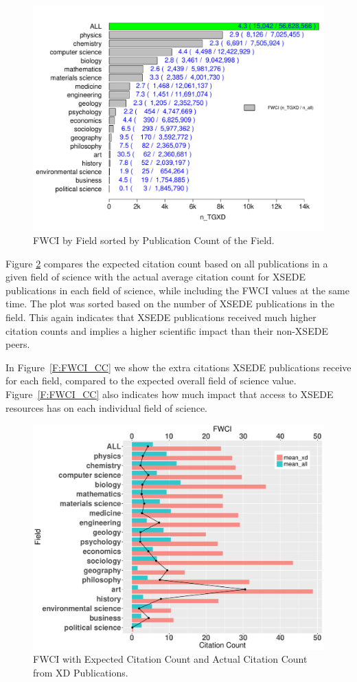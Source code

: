 \documentclass{sig-alternate}
\begin{document}
\begin{figure}[htb!]
    \includegraphics[width=0.95\columnwidth]{images/fwci_nxd.pdf}
    \caption{FWCI by Field sorted by Publication Count of the Field.}
    \label{F:fwci_nxd}
\end{figure}

Figure \ref{F:FWCIwCC} compares the expected citation count based on
all publications in a given field of science with the actual average
citation count for XSEDE publications in each field of science, while
including the FWCI values at the same time. The plot was sorted based
on the number of XSEDE publications in the field. This
again indicates that XSEDE publications received much higher citation
counts and implies a higher scientific impact than their non-XSEDE
peers.

In Figure~\ref{F:FWCI_CC} we show the extra citations XSEDE
publications receive for each field, compared to the expected overall
field of science value. Figure~\ref{F:FWCI_CC} also indicates how much
impact that access to XSEDE resources has on each individual field of
science.

\begin{figure}[htb!]
    \includegraphics[width=0.95\columnwidth]{images/FWCIwCC.pdf}
    \caption{FWCI with Expected Citation Count and Actual Citation Count from XD Publications.}
    \label{F:FWCIwCC}
\end{figure}
\end{document}
